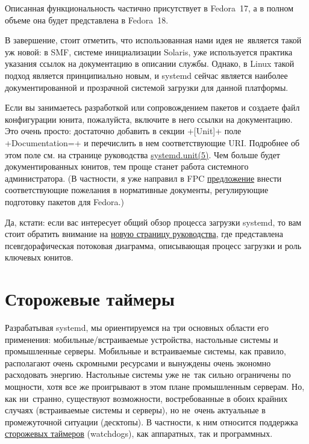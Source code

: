 \documentclass[10pt,oneside,a4paper]{article}
\begin{document}
Описанная функциональность частично присутствует в Fedora~17, а в полном
объеме она будет представлена в Fedora~18.

В завершение, стоит отметить, что использованная нами идея не~является такой уж
новой: в SMF, системе инициализации Solaris, уже используется практика
указания ссылок на документацию в описании службы. Однако, в Linux такой
подход является принципиально новым, и systemd сейчас является наиболее
документированной и прозрачной системой загрузки для данной платформы.

Если вы занимаетесь разработкой или сопровождением пакетов и создаете файл
конфигурации юнита, пожалуйста, включите в него ссылки на документацию. Это
очень просто: достаточно добавить в секции +[Unit]+ поле +Documentation=+ и
перечислить в нем соответствующие URI. Подробнее об этом поле см. на странице
руководства
\href{http://www.freedesktop.org/software/systemd/man/systemd.unit.html}{systemd.unit(5)}.
Чем больше будет документированных юнитов, тем проще станет работа системного
администратора. (В частности, я уже направил в FPC
\href{https://fedorahosted.org/fpc/ticket/192}{предложение} внести
соответствующие пожелания в нормативные документы, регулирующие подготовку
пакетов для Fedora.)

Да, кстати: если вас интересует общий обзор процесса загрузки systemd, то вам
стоит обратить внимание на
\href{http://www.freedesktop.org/software/systemd/man/bootup.html}{новую
страницу руководства}, где представлена псевгдорафическая потоковая диаграмма,
описывающая процесс загрузки и роль ключевых юнитов.

\section{Сторожевые таймеры}

Разрабатывая systemd, мы ориентируемся на три основных области его применения:
мобильные/встраиваемые устройства, настольные системы и промышленные серверы.
Мобильные и встраиваемые системы, как правило, располагают очень скромными
ресурсами и вынуждены очень экономно расходовать энергию. Настольные системы
уже не~так сильно ограничены по мощности, хотя все же проигрывают в
этом плане промышленным серверам. Но, как ни~странно, существуют
возможности, востребованные в обоих крайних случаях (встраиваемые системы и
серверы), но не~очень актуальные в промежуточной ситуации (десктопы). В
частности, к ним относится поддержка
\href{http://ru.wikipedia.org/wiki/Watchdog}{сторожевых таймеров} (watchdogs),
как аппаратных, так и программных.
\end{document}
